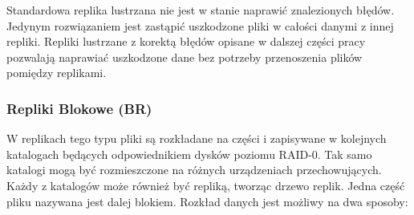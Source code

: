 Standardowa replika lustrzana nie jest w stanie naprawić znalezionych błędów. 
Jedynym rozwiązaniem jest zastąpić uszkodzone pliki w całości danymi z innej repliki. 
Repliki lustrzane z korektą błędów opisane w dalszej części pracy pozwalają 
naprawiać uszkodzone dane bez potrzeby przenoszenia plików pomiędzy replikami.
\subsubsection{Repliki Blokowe (BR)}
W replikach tego typu pliki są rozkładane na części i zapisywane w kolejnych katalogach 
będących odpowiednikiem dysków poziomu RAID-0. 
Tak samo katalogi mogą być rozmieszczone na różnych urządzeniach przechowujących. 
Każdy z katalogów może również być repliką, tworząc drzewo replik. 
Jedna część pliku nazywana jest dalej blokiem.
Rozkład danych jest możliwy na dwa sposoby:
